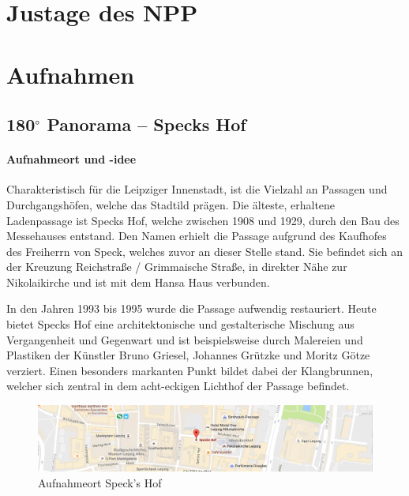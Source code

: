 \documentclass[liststotoc,bibtotoc,fontsize=14pt,]{scrreprt}
\begin{document}
	\chapter{Justage des NPP}
	\label{sec:npp}
	
	\chapter{Aufnahmen}
	\label{ch:aufnahmen}
	
	\section{180$^\circ$ Panorama -- Speck\grq s Hof}
	\label{sec:specks}

	\subsubsection{Aufnahmeort und -idee}
	Charakteristisch für die Leipziger Innenstadt, ist die Vielzahl an Passagen und Durchgangshöfen, welche das Stadtild prägen. Die älteste, erhaltene Ladenpassage ist Speck\grq s Hof, welche zwischen 1908 und 1929, durch den Bau des Messehauses entstand. Den Namen erhielt die Passage aufgrund des Kaufhofes des Freiherrn von Speck, welches zuvor an dieser Stelle stand. Sie befindet sich an der Kreuzung Reichstraße / Grimmaische Straße, in direkter Nähe zur Nikolaikirche und ist mit dem Hansa Haus verbunden. 
	
	\bigskip
	In den Jahren 1993 bis 1995 wurde die Passage aufwendig restauriert. Heute bietet Speck\grq s Hof eine architektonische und gestalterische Mischung aus Vergangenheit und Gegenwart und ist beispielsweise durch Malereien und Plastiken der Künstler Bruno Griesel, Johannes Grützke und Moritz Götze verziert. Einen besonders markanten Punkt bildet dabei der Klangbrunnen, welcher sich zentral in dem acht-eckigen Lichthof der Passage befindet.
	
			\begin{figure}[H]
				\includegraphics[width=\linewidth]{img/places/sh_map.jpg}
				\caption{Aufnahmeort Speck's Hof}
				\label{img:sh_map}
			\end{figure}
			
	
\end{document}
